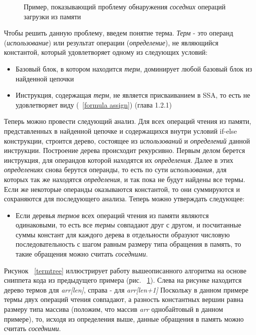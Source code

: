 \begin{figure}[!htb]
    \centering
    
    \caption{Пример, показывающий проблему обнаружения \textit{соседних} операций загрузки из памяти}
    \label{codetoir}
\end{figure}

Чтобы решить данную проблему, введем понятие терма. \textit{Терм} - это операнд (\textit{использование}) или результат операции (\textit{определение}), не являющийся константой, который удовлетворяет одному из следующих условий:

\begin{itemize}
    \item Базовый блок, в котором находится \textit{терм}, доминирует любой базовый блок из найденной цепочки
    \item Инструкция, содержащая \textit{терм}, не является присваиванием в SSA, то есть не удовлетворяет виду (~\ref{formula assign}) (глава 1.2.1)
\end{itemize}

Теперь можно провести следующий анализ. Для всех операций чтения из памяти, представленных в найденной цепочке и содержащихся внутри условий if-else конструкции, строится дерево, состоящее из \textit{использований} и \textit{определений} данной инструкции. Построение дерева происходит рекурсивно. Первым делом берется инструкция, для операндов которой находятся их \textit{определения}. Далее в этих \textit{определениях} снова берутся операнды, то есть по сути \textit{использования}, для которых так же находятся \textit{определения}, и так пока не будут найдены все термы. Если же некоторые операнды оказываются константой, то они суммируются и сохраняются для последующего анализа. Теперь можно утверждать следующее:

\begin{itemize}
    \item Если деревья \textit{термов} всех операций чтения из памяти являются одинаковыми, то есть все \textit{термы} совпадают друг с другом, и посчитанные суммы констант для каждого дерева в отдельности образуют числовую последовательность с шагом равным размеру типа обращения в память, то такие обращения можно считать \textit{соседними}.
\end{itemize}

Рисунок ~\ref{termtree} иллюстрирует работу вышеописанного алгоритма на основе сниппета кода из предыдущего примера (рис. ~\ref{codetoir}). Слева на рисунке находится дерево термов для \textit{arr[len]}, справа - для \textit{arr[len+1]} Поскольку в данном примере термы двух операций чтения совпадают, а разность константных вершин равна размеру типа массива (положим, что массив \textit{arr} однобайтовый в данном примере), то, исходя из определения выше, данные обращения в память можно считать \textit{соседними}.

